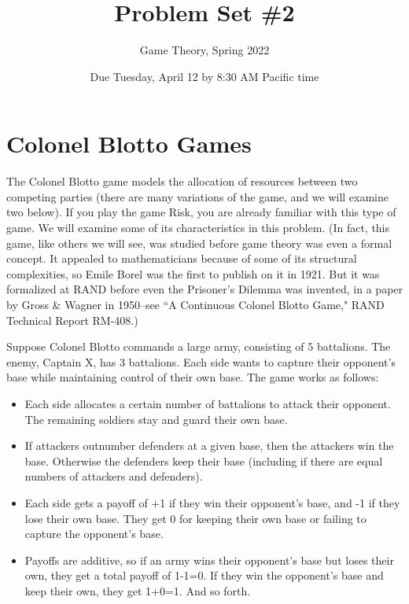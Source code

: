 \documentclass[10pt]{article}
\title{Problem Set \#2}
\author{Game Theory, Spring 2022}
\date{Due Tuesday, April 12 by 8:30 AM Pacific time}
\begin{document}
\maketitle


\section{Colonel Blotto Games}

The Colonel Blotto game models the allocation of resources between two competing parties (there are many variations of the game, and we will examine two below). If you play the game Risk, you are already familiar with this type of game. We will examine some of its characteristics in this problem. (In fact, this game, like others we will see, was studied before game theory was even a formal concept. It appealed to mathematicians because of some of its structural complexities, so Emile Borel was the first to publish on it in 1921. But it was formalized at RAND before even the Prisoner's Dilemma was invented, in a paper by Gross \& Wagner in 1950--see ``A Continuous Colonel Blotto Game," RAND Technical Report RM-408.)

Suppose Colonel Blotto commands a large army, consisting of 5 battalions. The enemy, Captain X, has 3 battalions. Each side wants to capture their opponent's base while maintaining control of their own base. The game works as follows:
\begin{itemize}
\item Each side allocates a certain number of battalions to attack their opponent. The remaining soldiers stay and guard their own base.
\item If attackers outnumber defenders at a given base, then the attackers win the base. Otherwise the defenders keep their base (including if there are equal numbers of attackers and defenders).
\item Each side gets a payoff of +1 if they win their opponent's base, and -1 if they lose their own base. They get 0 for keeping their own base or failing to capture the opponent's base.
\item Payoffs are additive, so if an army wins their opponent's base but loses their own, they get a total payoff of 1-1=0. If they win the opponent's base and keep their own, they get 1+0=1. And so forth.
\end{itemize}
\end{document}
